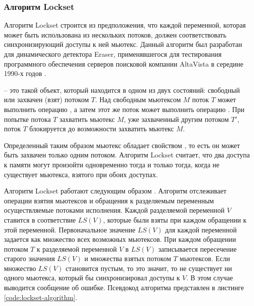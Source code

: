 \subsubsection{Алгоритм Lockset}

Алгоритм Lockset строится из предположения, что каждой переменной, которая может быть использована из нескольких потоков, должен соответствовать синхронизирующий доступы к ней мьютекс.
Данный алгоритм был разработан для динамического детектора Eraser, применявшегося для тестирования программного обеспечения серверов поисковой компании AltaVista в середине 1990-х годов \cite{eraser}.

\begin{definition}
 -- это такой объект, который находится в одном из двух состояний: свободный или захвачен (взят) потоком $T$.
Над свободным мьютексом $M$ поток $T$ может выполнить операцию , а затем этот же поток может выполнить операцию . При попытке потока $T$ захватить мьютекс $M$, уже захваченный другим потоком $T'$, поток $T$ блокируется до возможности захватить мьютекс $M$.
\end{definition}

Определенный таким образом мьютекс обладает свойством , то есть он может быть захвачен только одним потоком.
Алгоритм Lockset считает, что два доступа к памяти могут произойти одновременно тогда и только тогда, когда не существует мьютекса, взятого при обоих доступах.

Алгоритм Lockset работают следующим образом \cite{timur}.
Алгоритм отслеживает операции взятия мьютексов и обращения к разделяемым переменным осуществляемые потоками исполнения.
Каждой разделяемой переменной $V$ ставится в соответствие  $LS(V)$, которые были взяты при каждом обращении к этой переменной.
Первоначальное значение $LS(V)$ для каждой переменной задается как множество всех возможных мьютексов.
При каждом обращении потоком $T$ к разделяемой переменной $V$ в $LS(V)$ записывается пересечение старого значения $LS(V)$ и множества взятых потоком $T$ мьютексов.
Если множество $LS(V)$ становится пустым, то это значит, то не существует ни одного мьютекса, который бы синхронизировал доступы к $V$.
В этом случае выводится сообщение об ошибке.
Псевдокод алгоритма представлен в листинге \ref{code:lockset-algorithm}.

